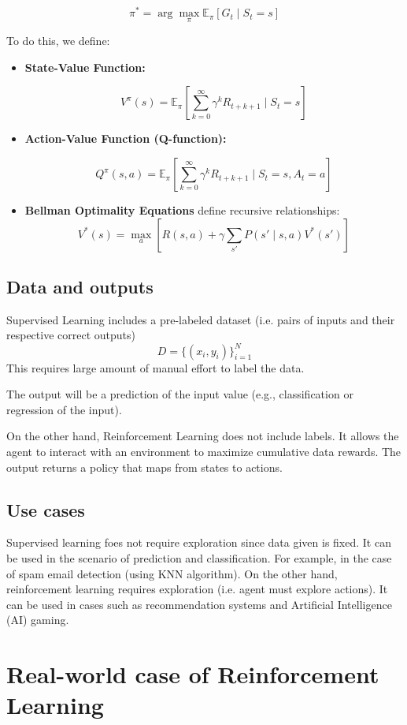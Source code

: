 \documentclass{article} %
\begin{document}
\[
\pi^* = \arg \max_{\pi} \mathbb{E}_{\pi} [G_t \mid S_t = s]
\]

To do this, we define:

\begin{itemize}
    \item \textbf{State-Value Function:}
    
    \[
    V^{\pi}(s) = \mathbb{E}_{\pi} \left[ \sum_{k=0}^{\infty} \gamma^k R_{t+k+1} \mid S_t = s \right]
    \]
    
    \item \textbf{Action-Value Function (Q-function):}
    
    \[
    Q^{\pi}(s, a) = \mathbb{E}_{\pi} \left[ \sum_{k=0}^{\infty} \gamma^k R_{t+k+1} \mid S_t = s, A_t = a \right]
    \]
    \item \textbf{Bellman Optimality Equations} define recursive relationships:
    \[
    V^*(s) = \max_a \left[ R(s, a) + \gamma \sum_{s'} P(s' \mid s, a) V^*(s') \right]
    \]
\end{itemize}


\subsection{Data and outputs}
Supervised Learning includes a pre-labeled dataset (i.e. pairs of inputs and their respective correct outputs) \[D = \{(x_i, y_i)\}_{i=1}^N \]
This requires large amount of manual effort to label the data. 

The output will be a prediction of the input value (e.g., classification or regression of the input).

On the other hand, Reinforcement Learning does not include labels. It allows the agent to interact with an environment to maximize cumulative data rewards. The output returns a policy that maps from states to actions.

\subsection{Use cases}
Supervised learning foes not require exploration since data given is fixed. It can be used in the scenario of prediction and classification. For example, in the case of spam email detection (using KNN algorithm).
On the other hand, reinforcement learning requires exploration (i.e. agent must explore actions). It can be used in cases such as recommendation systems and Artificial Intelligence (AI) gaming. 


\section{Real-world case of Reinforcement Learning}
\label{headings}
\end{document}
